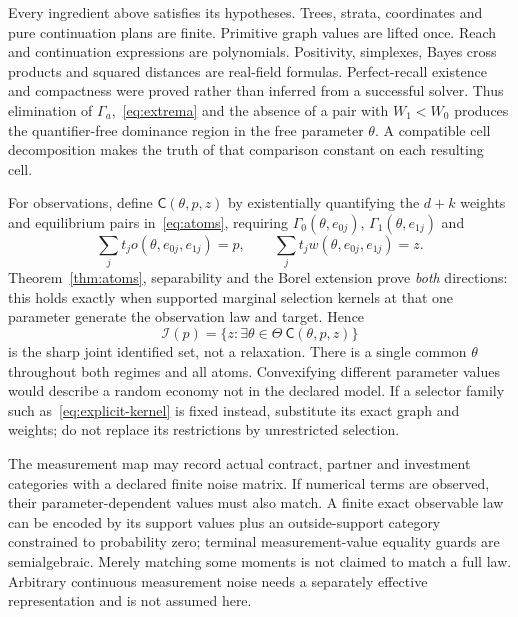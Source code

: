 \documentclass[11pt,a4paper]{article}
\numberwithin{equation}{section}
\theoremstyle{definition}
\begin{document}
Every ingredient above satisfies its hypotheses. Trees, strata, coordinates
and pure continuation plans are finite. Primitive graph values are lifted
once. Reach and continuation expressions are polynomials. Positivity,
simplexes, Bayes cross products and squared distances are real-field
formulas. Perfect-recall existence and compactness were proved rather
than inferred from a successful solver. Thus elimination of
$\Gamma_a$,~\eqref{eq:extrema} and the absence of a pair with
$W_1<W_0$ produces the quantifier-free dominance region in the free
parameter $\theta$. A compatible cell decomposition makes the truth
of that comparison constant on each resulting cell.

For observations, define $\mathsf C(\theta,p,z)$ by existentially
quantifying the $d+k$ weights and equilibrium pairs in~\eqref{eq:atoms},
requiring $\Gamma_0(\theta,e_{0j})$, $\Gamma_1(\theta,e_{1j})$ and
\begin{equation}\label{eq:certificate}
 \sum_jt_jo(\theta,e_{0j},e_{1j})=p,\qquad
 \sum_jt_jw(\theta,e_{0j},e_{1j})=z.
\end{equation}
Theorem~\ref{thm:atoms}, separability and the Borel extension prove
\emph{both} directions: this holds exactly when supported marginal
selection kernels at that one parameter generate the observation law
and target. Hence
\begin{equation}\label{eq:identified}
 \mathcal I(p)=\{z:\exists\theta\in\Theta\ 
                                  \mathsf C(\theta,p,z)\}
\end{equation}
is the sharp joint identified set, not a relaxation. There is a single
common $\theta$ throughout both regimes and all atoms. Convexifying
different parameter values would describe a random economy not in the
declared model. If a selector family such as~\eqref{eq:explicit-kernel}
is fixed instead, substitute its exact graph and weights; do not replace
its restrictions by unrestricted selection.

The measurement map may record actual contract, partner and investment
categories with a declared finite noise matrix. If numerical terms are
observed, their parameter-dependent values must also match. A finite
exact observable law can be encoded by its support values plus an
outside-support category constrained to probability zero; terminal
measurement-value equality guards are semialgebraic. Merely matching
some moments is not claimed to match a full law. Arbitrary continuous
measurement noise needs a separately effective representation and is
not assumed here.
\end{document}
